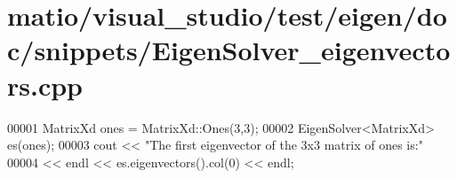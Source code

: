 \hypertarget{matio_2visual__studio_2test_2eigen_2doc_2snippets_2_eigen_solver__eigenvectors_8cpp_source}{}\section{matio/visual\+\_\+studio/test/eigen/doc/snippets/\+Eigen\+Solver\+\_\+eigenvectors.cpp}
\label{matio_2visual__studio_2test_2eigen_2doc_2snippets_2_eigen_solver__eigenvectors_8cpp_source}

\begin{DoxyCode}
00001 MatrixXd ones = MatrixXd::Ones(3,3);
00002 EigenSolver<MatrixXd> es(ones);
00003 cout << \textcolor{stringliteral}{"The first eigenvector of the 3x3 matrix of ones is:"}
00004      << endl << es.eigenvectors().col(0) << endl;
\end{DoxyCode}
